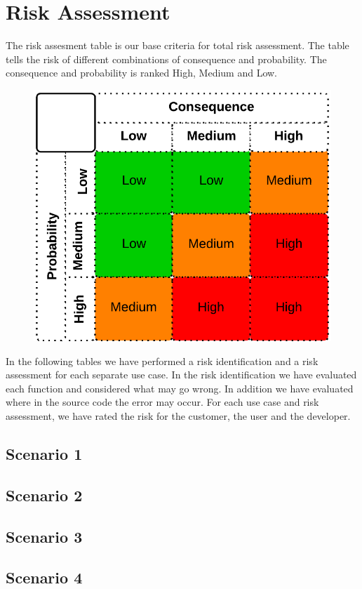 \chapter{Risk Assessment}

	The risk assesment table is our base criteria for total risk assessment. The table tells 
	the risk of different combinations of consequence and probability. The consequence and 
	probability is ranked High, Medium and Low. 

		\begin{figure}[H]
			\includegraphics[scale=0.3]{pics/risk.png}
		\end{figure}

	In the following tables we have performed a risk identification and a risk assessment for 
	each separate use case. In the risk identification we have evaluated each function and 
	considered what may go wrong. In addition we have evaluated where in the source code the 
	error may occur. For each use case and risk assessment, we have rated the risk for the customer, 
	the user and the developer. 

	\clearpage

	\section{Scenario 1}
	

	\section{Scenario 2}

	\section{Scenario 3}

	\section{Scenario 4}
